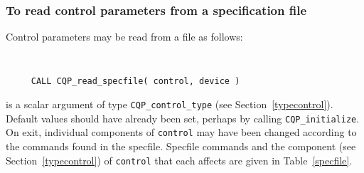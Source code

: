 \documentclass{galahad}
\newcommand{\packagename}{CQP}
\begin{document}
\subsubsection{To read control parameters from a specification file}
\label{readspec}

Control parameters may be read from a file as follows:
\hskip0.5in

\def\baselinestretch{0.8}
{\tt
\begin{verbatim}
     CALL CQP_read_specfile( control, device )
\end{verbatim}
}
\def\baselinestretch{1.0}

\begin{description}
 is a scalar \intentinout argument of type
{\tt \packagename\_control\_type}
(see Section~\ref{typecontrol}).
Default values should have already been set, perhaps by calling
{\tt \packagename\_initialize}.
On exit, individual components of {\tt control} may have been changed
according to the commands found in the specfile. Specfile commands and
the component (see Section~\ref{typecontrol}) of {\tt control}
that each affects are given in Table~\ref{specfile}.


\end{description}
\end{document}
